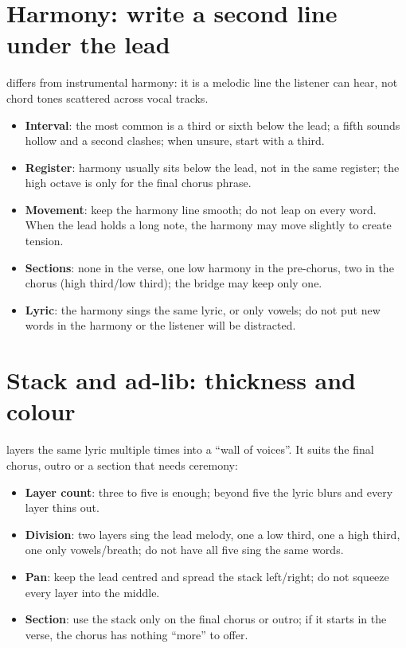\section{Harmony: write a second line under the lead}
\label{sec:harmony}

 differs from instrumental harmony: it is a melodic line the listener can hear, not chord tones scattered across vocal tracks.

\begin{itemize}
\item \textbf{Interval}: the most common is a third or sixth below the lead; a fifth sounds hollow and a second clashes; when unsure, start with a third.
\item \textbf{Register}: harmony usually sits below the lead, not in the same register; the high octave is only for the final chorus phrase.
\item \textbf{Movement}: keep the harmony line smooth; do not leap on every word. When the lead holds a long note, the harmony may move slightly to create tension.
\item \textbf{Sections}: none in the verse, one low harmony in the pre-chorus, two in the chorus (high third/low third); the bridge may keep only one.
\item \textbf{Lyric}: the harmony sings the same lyric, or only vowels; do not put new words in the harmony or the listener will be distracted.
\end{itemize}

\section{Stack and ad-lib: thickness and colour}
\label{sec:stack-adlib}

 layers the same lyric multiple times into a ``wall of voices''. It suits the final chorus, outro or a section that needs ceremony:

\begin{itemize}
\item \textbf{Layer count}: three to five is enough; beyond five the lyric blurs and every layer thins out.
\item \textbf{Division}: two layers sing the lead melody, one a low third, one a high third, one only vowels/breath; do not have all five sing the same words.
\item \textbf{Pan}: keep the lead centred and spread the stack left/right; do not squeeze every layer into the middle.
\item \textbf{Section}: use the stack only on the final chorus or outro; if it starts in the verse, the chorus has nothing ``more'' to offer.
\end{itemize}

